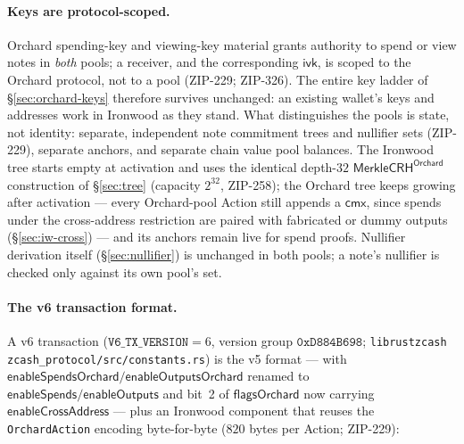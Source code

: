 \documentclass[11pt,a4paper]{article}
\theoremstyle{definition}
\newcommand{\cmx}{\mathsf{cmx}}
\newcommand{\ivk}{\ensuremath{\mathsf{ivk}}}
\begin{document}
\paragraph{Keys are protocol-scoped.} Orchard spending-key and viewing-key
material grants authority to spend or view notes in \emph{both} pools; a
receiver, and the corresponding $\ivk$, is scoped to the Orchard protocol,
not to a pool (ZIP-229; ZIP-326). The entire key ladder of
\S\ref{sec:orchard-keys} therefore survives unchanged: an existing wallet's
keys and addresses work in Ironwood as they stand. What distinguishes the
pools is state, not identity: separate, independent note commitment trees
and nullifier sets (ZIP-229), separate anchors, and separate chain value
pool balances. The Ironwood tree starts empty at activation and uses the
identical depth-$32$ $\mathsf{MerkleCRH}^{\mathsf{Orchard}}$ construction of
\S\ref{sec:tree} (capacity $2^{32}$, ZIP-258); the Orchard tree keeps
growing after activation --- every Orchard-pool Action still appends a
$\cmx$, since spends under the cross-address restriction are paired with
fabricated or dummy outputs (\S\ref{sec:iw-cross}) --- and its anchors
remain live for spend proofs. Nullifier derivation itself
(\S\ref{sec:nullifier}) is unchanged in both pools; a note's nullifier is
checked only against its own pool's set.

\paragraph{The v6 transaction format.} A v6 transaction
($\texttt{V6\_TX\_VERSION} = 6$, version group
$\mathtt{0xD884B698}$; \texttt{librustzcash
zcash\_protocol/src/constants.rs}) is the v5 format --- with
$\mathsf{enableSpendsOrchard}/\mathsf{enableOutputsOrchard}$ renamed to
$\mathsf{enableSpends}/\mathsf{enableOutputs}$ and bit~2 of
$\mathsf{flagsOrchard}$ now carrying $\mathsf{enableCrossAddress}$ --- plus
an Ironwood component that reuses the \texttt{OrchardAction} encoding
byte-for-byte ($820$ bytes per Action; ZIP-229):
\end{document}
